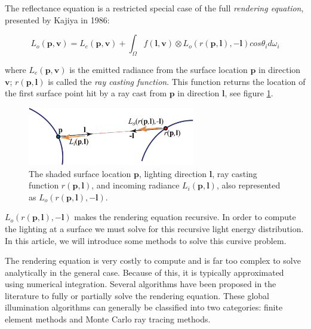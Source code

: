 The reflectance equation is a restricted special case of the full \textit{rendering equation}, presented by Kajiya in 1986\cite{a:TheRenderingEquation}:

\begin{equation}
	L_o(\mathbf{p},\mathbf{v})=L_e(\mathbf{p},\mathbf{v})+\int_\Omega f(\mathbf{l},\mathbf{v})\otimes L_o(r(\mathbf{p},\mathbf{l}),-\mathbf{l})cos\theta_i d\omega_i
\end{equation}

where $L_e(\mathbf{p},\mathbf{v})$ is the emitted radiance from the surface location $\mathbf{p}$ in direction $\mathbf{v}$; $r(\mathbf{p},\mathbf{l})$ is called the \textit{ray casting function}. This function returns the location of the first surface point hit by a ray cast from $\mathbf{p}$ in direction $\mathbf{l}$, see figure \ref{f:ray-casting-function}.

\begin{figure}\label{f:ray-casting-function}
	\sidecaption
		\includegraphics[width=0.65\textwidth]{graphics/gi/ray-optics-14}
	\caption{The shaded surface location $\mathbf{p}$, lighting direction $\mathbf{l}$, ray casting function $r(\mathbf{p}, \mathbf{l})$, and incoming radiance $L_i(\mathbf{p}, \mathbf{l})$, also represented as $L_o(r(\mathbf{p}, \mathbf{l}), −\mathbf{l})$.}
\end{figure}

$L_o(r(\mathbf{p},\mathbf{l}),-\mathbf{l})$ makes the rendering equation recursive. In order to compute the lighting at a surface we must solve for this recursive light energy distribution. In this article, we will introduce some methods to solve this cursive problem.

The rendering equation is very costly to compute and is far too complex to solve analytically in the general case. Because of this, it is typically approximated using numerical integration. Several algorithms have been proposed in the literature to fully or partially solve the rendering equation. These global illumination algorithms can generally be classified into two categories: finite element methods and Monte Carlo ray tracing methods.



